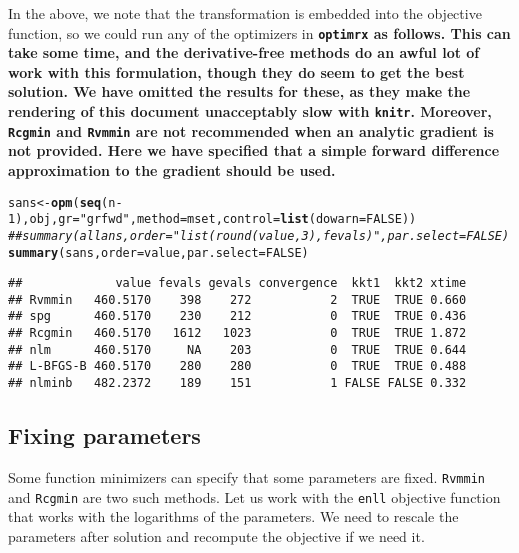 \documentclass[11pt]{article}\usepackage[]{graphicx}\usepackage[]{color}
\makeatletter
\newcommand{\hlnum}[1]{\textcolor[rgb]{0.686,0.059,0.569}{#1}}%
\newcommand{\hlstr}[1]{\textcolor[rgb]{0.192,0.494,0.8}{#1}}%
\newcommand{\hlcom}[1]{\textcolor[rgb]{0.678,0.584,0.686}{\textit{#1}}}%
\newcommand{\hlopt}[1]{\textcolor[rgb]{0,0,0}{#1}}%
\newcommand{\hlstd}[1]{\textcolor[rgb]{0.345,0.345,0.345}{#1}}%
\newcommand{\hlkwb}[1]{\textcolor[rgb]{0.69,0.353,0.396}{#1}}%
\newcommand{\hlkwc}[1]{\textcolor[rgb]{0.333,0.667,0.333}{#1}}%
\newcommand{\hlkwd}[1]{\textcolor[rgb]{0.737,0.353,0.396}{\textbf{#1}}}%
\newenvironment{kframe}{%
 \def\at@end@of@kframe{}%
 \ifinner\ifhmode%
  \def\at@end@of@kframe{\end{minipage}}%
  \begin{minipage}{\columnwidth}%
 \fi\fi%
 \def\FrameCommand##1{\hskip\@totalleftmargin \hskip-\fboxsep
 \colorbox{shadecolor}{##1}\hskip-\fboxsep
     \hskip-\linewidth \hskip-\@totalleftmargin \hskip\columnwidth}%
 \MakeFramed {\advance\hsize-\width
   \@totalleftmargin\z@ \linewidth\hsize
   \@setminipage}}%
 {\par\unskip\endMakeFramed%
 \at@end@of@kframe}
\newenvironment{knitrout}{}{} %
\newcommand{\code}[1]{{\tt#1}}
\newcommand{\pkg}[1]{\bf{\tt#1}\rm }
\makeatother
\begin{document}
In the above, we note that the transformation is embedded into the objective function, 
so we could run any of the optimizers in \pkg{optimrx} as follows. This can take some time, 
and the derivative-free
methods do an awful lot of work with this formulation, though they do seem to get the
best solution. We have omitted the results for these, as they make the rendering of
this document unacceptably slow with \code{knitr}. Moreover, \code{Rcgmin}
and \code{Rvmmin} are not recommended when an analytic gradient is not provided. Here
we have specified that a simple forward difference approximation to the gradient
should be used. 

\begin{knitrout}\scriptsize
{}\color{fgcolor}\begin{kframe}
\begin{alltt}
\hlstd{sans}\hlkwb{<-} \hlkwd{opm}\hlstd{(}\hlkwd{seq}\hlstd{(n}\hlopt{-}\hlnum{1}\hlstd{), obj,} \hlkwc{gr}\hlstd{=}\hlstr{"grfwd"}\hlstd{,} \hlkwc{method}\hlstd{=mset,} \hlkwc{control}\hlstd{=}\hlkwd{list}\hlstd{(}\hlkwc{dowarn}\hlstd{=}\hlnum{FALSE}\hlstd{))}
\hlcom{## summary(allans, order = "list(round(value, 3), fevals)", par.select = FALSE)}
\hlkwd{summary}\hlstd{(sans,} \hlkwc{order} \hlstd{= value,} \hlkwc{par.select} \hlstd{=} \hlnum{FALSE}\hlstd{)}
\end{alltt}
\begin{verbatim}
##             value fevals gevals convergence  kkt1  kkt2 xtime
## Rvmmin   460.5170    398    272           2  TRUE  TRUE 0.660
## spg      460.5170    230    212           0  TRUE  TRUE 0.436
## Rcgmin   460.5170   1612   1023           0  TRUE  TRUE 1.872
## nlm      460.5170     NA    203           0  TRUE  TRUE 0.644
## L-BFGS-B 460.5170    280    280           0  TRUE  TRUE 0.488
## nlminb   482.2372    189    151           1 FALSE FALSE 0.332
\end{verbatim}
\end{kframe}
\end{knitrout}

\subsection{Fixing parameters}

Some function minimizers can specify that some parameters are fixed. \code{Rvmmin} and
\code{Rcgmin} are two such methods. Let us work with the \code{enll} objective function
that works with the logarithms of the parameters.
We need to rescale the parameters after solution and recompute the objective if we need it.
\end{document}
